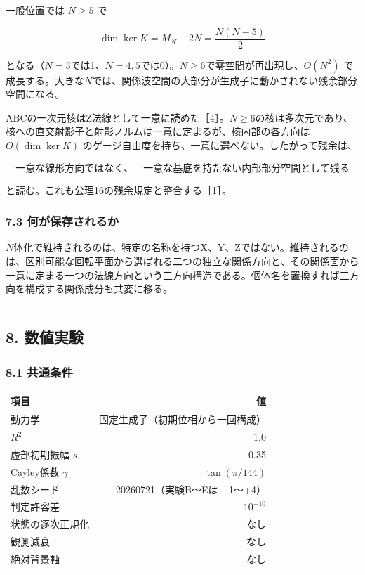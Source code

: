 \documentclass[
  a4paper,
]{ltjsarticle}
\newcounter{none} %
\begin{document}
一般位置では \(N\ge5\) で

\[
\dim\ker K
=
M_N-2N
=
\frac{N(N-5)}{2}
\]

となる（\(N=3\)では1、\(N=4,5\)では0）。\(N\ge6\)で零空間が再出現し、\(O(N^2)\)
で成長する。大きな\(N\)では、関係波空間の大部分が生成子に動かされない残余部分空間になる。

ABCの一次元核はZ法線として一意に読めた［4］。\(N\ge6\)の核は多次元であり、核への直交射影子と射影ノルムは一意に定まるが、核内部の各方向は
\(O(\dim\ker K)\)
のゲージ自由度を持ち、一意に選べない。したがって残余は、

\[
\boxed{
\text{一意な線形方向ではなく、}
\quad
\text{一意な基底を持たない内部部分空間として残る}
}
\]

と読む。これも公理16の残余規定と整合する［1］。

\subsubsection{7.3
何が保存されるか}\label{ux4f55ux304cux4fddux5b58ux3055ux308cux308bux304b}

\(N\)体化で維持されるのは、特定の名称を持つX、Y、Zではない。維持されるのは、区別可能な回転平面から選ばれる二つの独立な関係方向と、その関係面から一意に定まる一つの法線方向という三方向構造である。個体名を置換すれば三方向を構成する関係成分も共変に移る。

\begin{center}\rule{0.5\linewidth}{0.5pt}\end{center}

\subsection{8. 数値実験}\label{ux6570ux5024ux5b9fux9a13}

\subsubsection{8.1 共通条件}\label{ux5171ux901aux6761ux4ef6}

{\def\LTcaptype{none} %
\begin{longtable}[]{@{}lr@{}}
\toprule\noalign{}
項目 & 値 \\
\midrule\noalign{}
\endhead
\bottomrule\noalign{}
\endlastfoot
動力学 & 固定生成子（初期位相から一回構成） \\
\(R^2\) & 1.0 \\
虚部初期振幅 \(s\) & 0.35 \\
Cayley係数 \(\gamma\) & \(\tan(\pi/144)\) \\
乱数シード & 20260721（実験B〜Eは +1〜+4） \\
判定許容差 & \(10^{-10}\) \\
状態の逐次正規化 & なし \\
観測減衰 & なし \\
絶対背景軸 & なし \\
\end{longtable}
}
\end{document}

